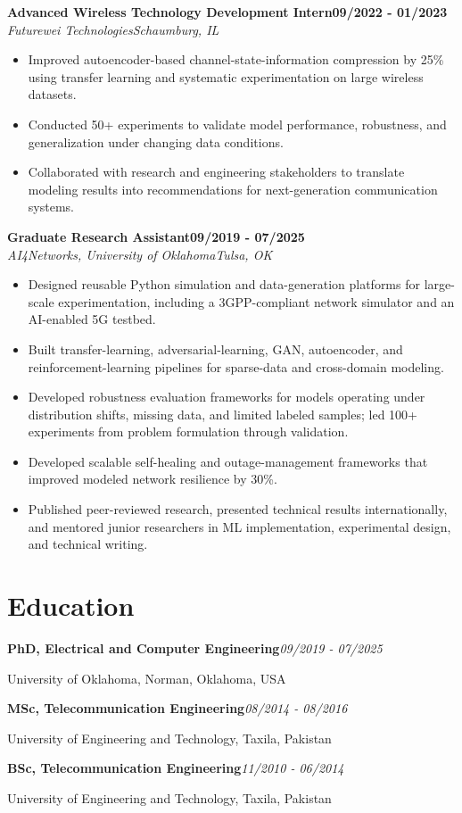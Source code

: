 \documentclass[9pt,letterpaper]{extarticle}
\newcommand{\role}[4]{%
  \Needspace{4\baselineskip}\textbf{#1}\hfill\textbf{#2}\\[-1pt]
  \textit{#3}\hfill\textit{#4}\par}
\newcommand{\entry}[2]{\Needspace{4\baselineskip}\textbf{#1}\hfill\textit{#2}\par}
\begin{document}
\role{Advanced Wireless Technology Development Intern}{09/2022 - 01/2023}{Futurewei Technologies}{Schaumburg, IL}
\begin{itemize}
\item Improved autoencoder-based channel-state-information compression by 25\% using transfer learning and systematic experimentation on large wireless datasets.
\item Conducted 50+ experiments to validate model performance, robustness, and generalization under changing data conditions.
\item Collaborated with research and engineering stakeholders to translate modeling results into recommendations for next-generation communication systems.
\end{itemize}
\role{Graduate Research Assistant}{09/2019 - 07/2025}{AI4Networks, University of Oklahoma}{Tulsa, OK}
\begin{itemize}
\item Designed reusable Python simulation and data-generation platforms for large-scale experimentation, including a 3GPP-compliant network simulator and an AI-enabled 5G testbed.
\item Built transfer-learning, adversarial-learning, GAN, autoencoder, and reinforcement-learning pipelines for sparse-data and cross-domain modeling.
\item Developed robustness evaluation frameworks for models operating under distribution shifts, missing data, and limited labeled samples; led 100+ experiments from problem formulation through validation.
\item Developed scalable self-healing and outage-management frameworks that improved modeled network resilience by 30\%.
\item Published peer-reviewed research, presented technical results internationally, and mentored junior researchers in ML implementation, experimental design, and technical writing.
\end{itemize}
\section{Education}
\entry{PhD, Electrical and Computer Engineering}{09/2019 - 07/2025}
University of Oklahoma, Norman, Oklahoma, USA\par
\entry{MSc, Telecommunication Engineering}{08/2014 - 08/2016}
University of Engineering and Technology, Taxila, Pakistan\par
\entry{BSc, Telecommunication Engineering}{11/2010 - 06/2014}
University of Engineering and Technology, Taxila, Pakistan\par
{}
\end{document}
